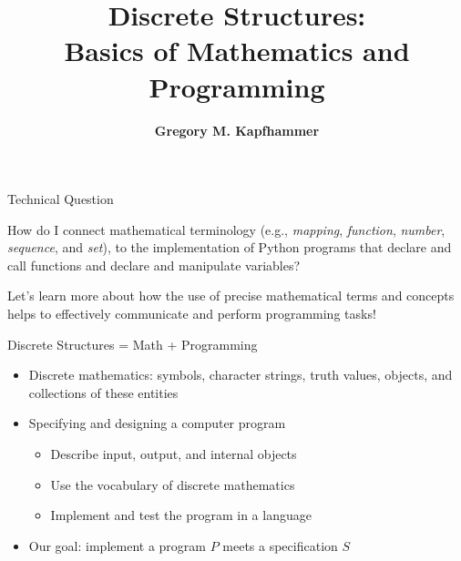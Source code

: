 \documentclass[14pt,aspectratio=169]{beamer}
\title{Discrete Structures: \\ Basics of Mathematics and Programming}
\author{{\bf Gregory M. Kapfhammer}}
\institute[shortinst]{{\bf Department of Computer Science, Allegheny College}}
\begin{document}
{
  \begin{frame}
    \titlepage
  \end{frame}
}

%
\begin{frame}{Technical Question}
  \begin{center}
    {\large How do I connect mathematical terminology (e.g., {\em mapping}, {\em
      function}, {\em number}, {\em sequence}, and {\em set}), to the
      implementation of Python programs that declare and call functions and declare
    and manipulate variables?}
  \end{center}
  \vspace{2ex}
  \begin{center}
    \small Let's learn more about how the use of precise mathematical terms and
    concepts helps to effectively communicate and perform programming tasks!
  \end{center}
\end{frame}

%
\begin{frame}{Discrete Structures = Math + Programming}
%
  \begin{itemize}
    \item Discrete mathematics: symbols, character strings, truth values,
      objects, and collections of these entities
    \item Specifying and designing a computer program
      \begin{itemize}
        \item Describe input, output, and internal objects
        \item Use the vocabulary of discrete mathematics
        \item Implement and test the program in a language
      \end{itemize}
    \item Our goal: implement a program $P$ meets a specification $S$
  \end{itemize}
%
\end{frame}
\end{document}
